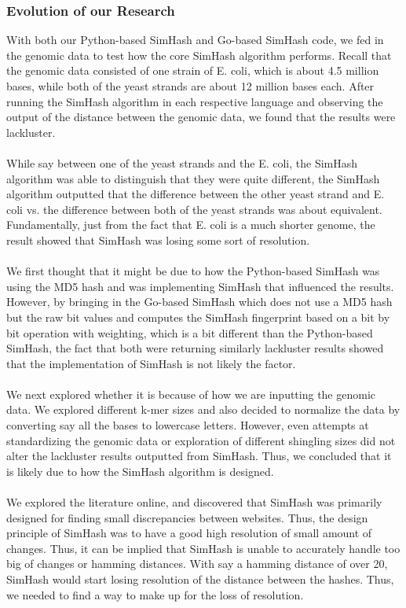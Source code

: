 \documentclass[12pt, letterpaper]{article}
\begin{document}
\subsubsection{Evolution of our Research}
With both our Python-based SimHash and Go-based SimHash code, we fed in the genomic data to test how the core SimHash algorithm performs. Recall that the genomic data consisted of one strain of E. coli, which is about 4.5 million bases, while both of the yeast strands are about 12 million bases each. After running the SimHash algorithm in each respective language and observing the output of the distance between the genomic data, we found that the results were lackluster. \\ \\
While say between one of the yeast strands and the E. coli, the SimHash algorithm was able to distinguish that they were quite different, the SimHash algorithm outputted that the difference between the other yeast strand and E. coli vs. the difference between both of the yeast strands was about equivalent. Fundamentally, just from the fact that E. coli is a much shorter genome, the result showed that SimHash was losing some sort of resolution. \\ \\
We first thought that it might be due to how the Python-based SimHash was using the MD5 hash and was implementing SimHash that influenced the results. However, by bringing in the Go-based SimHash which does not use a MD5 hash but the raw bit values and computes the SimHash fingerprint based on a bit by bit operation with weighting, which is a bit different than the Python-based SimHash, the fact that both were returning similarly lackluster results showed that the implementation of SimHash is not likely the factor.  \\ \\
We next explored whether it is because of how we are inputting the genomic data. We explored different k-mer sizes and also decided to normalize the data by converting say all the bases to lowercase letters. However, even attempts at standardizing the genomic data or exploration of different shingling sizes did not alter the lackluster results outputted from SimHash. Thus, we concluded that it is likely due to how the SimHash algorithm is designed. \\ \\
We explored the literature online, and discovered that SimHash was primarily designed for finding small discrepancies between websites. Thus, the design principle of SimHash was to have a good high resolution of small amount of changes. Thus, it can be implied that SimHash is unable to accurately handle too big of changes or hamming distances. With say a hamming distance of over 20, SimHash would start losing resolution of the distance between the hashes. Thus, we needed to find a way to make up for the loss of resolution.
\end{document}
